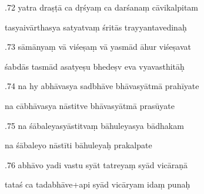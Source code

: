 \documentclass[article,12pt,a4paper]{memoir}%
\newcounter{parCount}
\begin{document}
	  
	  \pstart {}.72 yatra draṣṭā ca dṛśyaṃ ca darśanaṃ cāvikalpitam 
	{}
	\pend%
      

	  
	  \pstart \leavevmode%
	tasyaivārthasya satyatvaṃ śritās trayyantavedinaḥ 
	{}
	\pend%
      

	  
	  \pstart {}.73 sāmānyaṃ vā viśeṣaṃ vā yasmād āhur viśeṣavat 
	{}
	\pend%
      

	  
	  \pstart \leavevmode%
	śabdās tasmād asatyeṣu bhedeṣv eva vyavasthitāḥ 
	{}
	\pend%
      

	  
	  \pstart {}.74 na hy abhāvasya sadbhāve bhāvasyātmā prahīyate 
	{}
	\pend%
      

	  
	  \pstart \leavevmode%
	na cābhāvasya nāstitve bhāvasyātmā prasūyate 
	{}
	\pend%
      

	  
	  \pstart {}.75 na śābaleyasyāstitvaṃ bāhuleyasya bādhakam 
	{}
	\pend%
      

	  
	  \pstart \leavevmode%
	na śābaleyo nāstīti bāhuleyaḥ prakalpate 
	{}
	\pend%
      

	  
	  \pstart {}.76 abhāvo yadi vastu syāt tatreyaṃ syād vicāraṇā 
	{}
	\pend%
      

	  
	  \pstart \leavevmode%
	tataś ca tadabhāve+api syād vicāryam idaṃ punaḥ 
	{}
	\pend%
      
\end{document}
